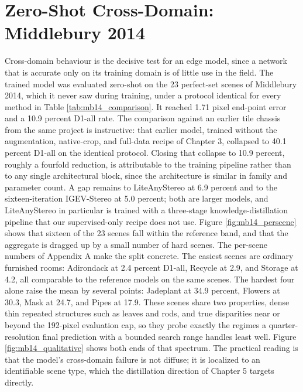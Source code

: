 \section{Zero-Shot Cross-Domain: Middlebury 2014}
Cross-domain behaviour is the decisive test for an edge model, since a
network that is accurate only on its training domain is of little use in
the field. The trained model was evaluated zero-shot on the 23
perfect-set scenes of Middlebury 2014, which it never saw during training,
under a protocol identical for every method in Table
\ref{tab:mb14_comparison}. It reached 1.71 pixel end-point error and a
10.9 percent D1-all rate. The comparison against an earlier tile chassis
from the same project is instructive: that earlier model, trained without
the augmentation, native-crop, and full-data recipe of Chapter 3,
collapsed to 40.1 percent D1-all on the identical protocol. Closing that
collapse to 10.9 percent, roughly a fourfold reduction, is attributable
to the training pipeline rather than to any single architectural block,
since the architecture is similar in family and parameter count. A gap
remains to LiteAnyStereo at 6.9 percent and to the sixteen-iteration
IGEV-Stereo at 5.0 percent; both are larger models, and LiteAnyStereo in
particular is trained with a three-stage knowledge-distillation pipeline
that our supervised-only recipe does not use. Figure
\ref{fig:mb14_perscene} shows that sixteen of the 23 scenes fall within
the reference band, and that the aggregate is dragged up by a small
number of hard scenes. The per-scene numbers of Appendix A make the split
concrete. The easiest scenes are ordinary furnished rooms: Adirondack at
2.4 percent D1-all, Recycle at 2.9, and Storage at 4.2, all comparable to
the reference models on the same scenes. The hardest four alone raise the
mean by several points: Jadeplant at 34.9 percent, Flowers at 30.3, Mask
at 24.7, and Pipes at 17.9. These scenes share two properties, dense thin
repeated structures such as leaves and rods, and true disparities near or
beyond the 192-pixel evaluation cap, so they probe exactly the regimes a
quarter-resolution final prediction with a bounded search range handles
least well. Figure \ref{fig:mb14_qualitative} shows both ends of that
spectrum. The practical reading is that the model's cross-domain failure
is not diffuse; it is localized to an identifiable scene type, which the
distillation direction of Chapter 5 targets directly.

